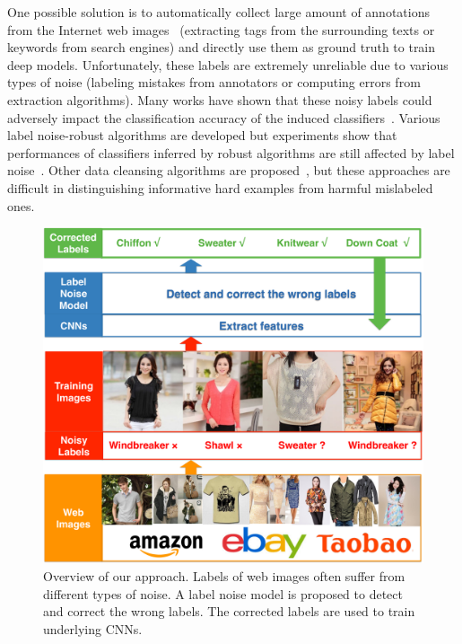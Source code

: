 \documentclass[10pt,twocolumn,letterpaper]{article}
\begin{document}
One possible solution is to automatically collect large amount of annotations from the Internet web images~\cite{gong2014multiview} (\ie extracting tags from the surrounding texts or keywords from search engines) and directly use them as ground truth to train deep models. Unfortunately, these labels are extremely unreliable due to various types of noise (\eg labeling mistakes from annotators or computing errors from extraction algorithms). Many works have shown that these noisy labels could adversely impact the classification accuracy of the induced classifiers~\cite{zhu2004class,nettleton2010study,pechenizkiy2006class}. Various label noise-robust algorithms are developed but experiments show that performances of classifiers inferred by robust algorithms are still affected by label noise~\cite{bartlett2006convexity,teng2001comparison}. Other data cleansing algorithms are proposed~\cite{barandela2000decontamination,brodley2011identifying,miranda2009use}, but these approaches are difficult in distinguishing informative hard examples from harmful mislabeled ones.

\begin{figure}[t]
\begin{center}
\includegraphics[width=1.0\linewidth]{figure/overview.pdf}
\end{center}
\caption{Overview of our approach. Labels of web images often suffer from different types of noise. A label noise model is proposed to detect and correct the wrong labels. The corrected labels are used to train underlying CNNs.}
\label{fig:overview}
\end{figure}
\end{document}
